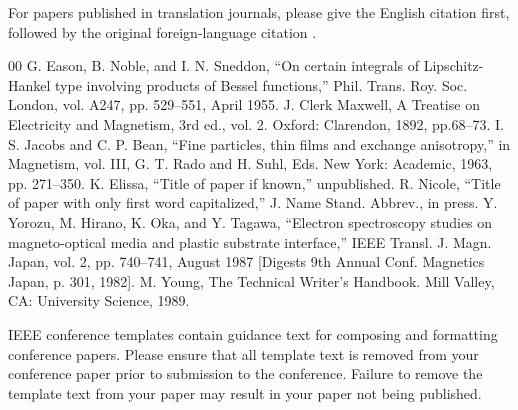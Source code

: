 \documentclass[conference, one column]{IEEEtran}
\begin{document}
For papers published in translation journals, please give the English 
citation first, followed by the original foreign-language citation \cite{b6}.

\begin{thebibliography}{00}
 G. Eason, B. Noble, and I. N. Sneddon, ``On certain integrals of Lipschitz-Hankel type involving products of Bessel functions,'' Phil. Trans. Roy. Soc. London, vol. A247, pp. 529--551, April 1955.
 J. Clerk Maxwell, A Treatise on Electricity and Magnetism, 3rd ed., vol. 2. Oxford: Clarendon, 1892, pp.68--73.
 I. S. Jacobs and C. P. Bean, ``Fine particles, thin films and exchange anisotropy,'' in Magnetism, vol. III, G. T. Rado and H. Suhl, Eds. New York: Academic, 1963, pp. 271--350.
 K. Elissa, ``Title of paper if known,'' unpublished.
 R. Nicole, ``Title of paper with only first word capitalized,'' J. Name Stand. Abbrev., in press.
 Y. Yorozu, M. Hirano, K. Oka, and Y. Tagawa, ``Electron spectroscopy studies on magneto-optical media and plastic substrate interface,'' IEEE Transl. J. Magn. Japan, vol. 2, pp. 740--741, August 1987 [Digests 9th Annual Conf. Magnetics Japan, p. 301, 1982].
 M. Young, The Technical Writer's Handbook. Mill Valley, CA: University Science, 1989.
\end{thebibliography}
\vspace{12pt}
\color{red}
IEEE conference templates contain guidance text for composing and formatting conference papers. Please ensure that all template text is removed from your conference paper prior to submission to the conference. Failure to remove the template text from your paper may result in your paper not being published.
\end{document}
